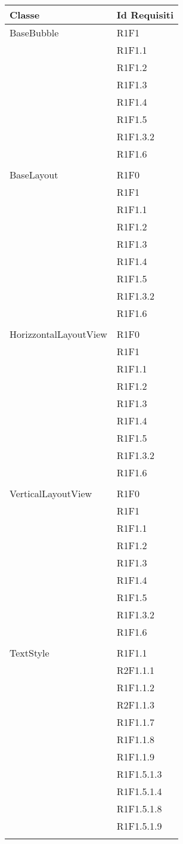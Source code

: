 \begin{center}
	\begin{longtable}{|p{7cm}|p{5cm}|}\hline
		Classe & Id Requisiti \\ \hline
		BaseBubble & R1F1 \\ & R1F1.1 \\ & R1F1.2 \\ & R1F1.3 \\ & R1F1.4 \\ & R1F1.5 \\ & R1F1.3.2 \\ & R1F1.6 \\ & \\ \hline
		BaseLayout & R1F0 \\ & R1F1 \\ & R1F1.1 \\ & R1F1.2 \\ & R1F1.3 \\ & R1F1.4 \\ & R1F1.5 \\ & R1F1.3.2 \\ & R1F1.6 \\ & \\ \hline
		HorizzontalLayoutView & R1F0 \\ & R1F1 \\ & R1F1.1 \\ & R1F1.2 \\ & R1F1.3 \\ & R1F1.4 \\ & R1F1.5 \\ & R1F1.3.2 \\ & R1F1.6 \\ & \\ \hline
		VerticalLayoutView & R1F0 \\ & R1F1 \\ & R1F1.1 \\ & R1F1.2 \\ & R1F1.3 \\ & R1F1.4 \\ & R1F1.5 \\ & R1F1.3.2 \\ & R1F1.6 \\ & \\ \hline
		TextStyle & R1F1.1 \\ & R2F1.1.1 \\ & R1F1.1.2 \\ & R2F1.1.3 \\ & R1F1.1.7 \\ & R1F1.1.8 \\ & R1F1.1.9 \\ & R1F1.5.1.3 \\ & R1F1.5.1.4 \\ & R1F1.5.1.8 \\ & R1F1.5.1.9 \\ & \\ \hline

\end{longtable}
\end{center}
